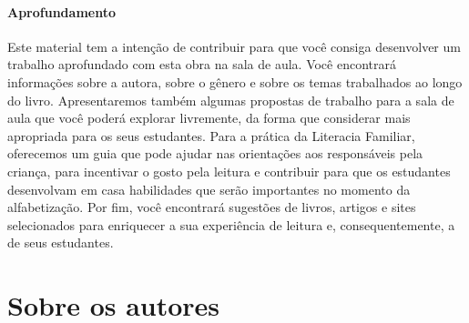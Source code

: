 \documentclass[11pt]{extarticle}
\begin{document}
\paragraph{Aprofundamento} Este material tem a 
intenção de contribuir para que você consiga desenvolver um trabalho aprofundado 
com esta obra na sala de aula. Você encontrará informações sobre a autora, sobre 
o gênero e sobre os temas trabalhados ao longo do livro. Apresentaremos também 
algumas propostas de trabalho para a sala de aula que você poderá explorar livremente, 
da forma que considerar mais apropriada para os seus estudantes. Para a prática 
da Literacia Familiar, oferecemos um guia que pode ajudar nas orientações aos 
responsáveis pela criança, para incentivar o gosto pela leitura e contribuir para 
que os estudantes desenvolvam em casa habilidades que serão importantes no momento 
da alfabetização. Por fim, você encontrará sugestões de livros, artigos e sites 
selecionados para enriquecer a sua experiência de leitura e, 
consequentemente, a de seus estudantes.



\section{Sobre os autores}


\end{document}
